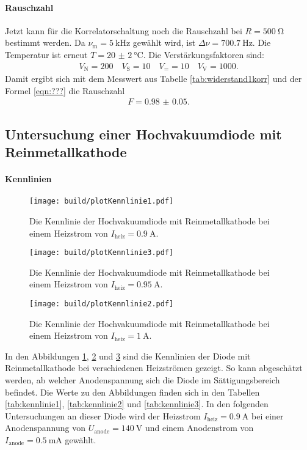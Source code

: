 \paragraph{Rauschzahl}

Jetzt kann für die Korrelatorschaltung noch die Rauschzahl bei $R = \SI{500}{\ohm}$ bestimmt werden. Da $\nu_\text{m} = \SI{5}{\kilo\hertz}$ gewählt wird, ist $\Delta \nu = \SI{700.7}{\hertz}$. Die Temperatur ist erneut $T = \SI{20(2)}{\celsius}$. Die Verstärkungsfaktoren sind:
\begin{align*}
  V_\text{N} = 200 \quad V_\text{S} = 10 \quad V_= = 10 \quad V_\text{V} = 1000.
\end{align*}
Damit ergibt sich mit dem Messwert aus Tabelle \ref{tab:widerstand1korr} und der Formel \eqref{eqn:???} die Rauschzahl
\begin{align}
  F = \num{0.98(5)}.
\end{align}

\subsection{Untersuchung einer Hochvakuumdiode mit Reinmetallkathode}

\paragraph{Kennlinien}
\begin{figure}
  \centering
  \texttt{[image: build/plotKennlinie1.pdf]}
  \caption{Die Kennlinie der Hochvakuumdiode mit Reinmetallkathode bei einem Heizstrom von $I_\text{heiz} = \SI{0.9}{\ampere}$.}
  \label{fig:plotKennlinie1}
\end{figure}
\begin{figure}
  \centering
  \texttt{[image: build/plotKennlinie3.pdf]}
  \caption{Die Kennlinie der Hochvakuumdiode mit Reinmetallkathode bei einem Heizstrom von $I_\text{heiz} = \SI{0.95}{\ampere}$.}
  \label{fig:plotKennlinie3}
\end{figure}
\begin{figure}
  \centering
  \texttt{[image: build/plotKennlinie2.pdf]}
  \caption{Die Kennlinie der Hochvakuumdiode mit Reinmetallkathode bei einem Heizstrom von $I_\text{heiz} = \SI{1}{\ampere}$.}
  \label{fig:plotKennlinie2}
\end{figure}
In den Abbildungen \ref{fig:plotKennlinie1}, \ref{fig:plotKennlinie3} und \ref{fig:plotKennlinie2} sind die Kennlinien der Diode mit Reinmetallkathode bei verschiedenen Heizströmen gezeigt. So kann abgeschätzt werden, ab welcher Anodenspannung sich die Diode im Sättigungsbereich befindet.
Die Werte zu den Abbildungen finden sich in den Tabellen \ref{tab:kennlinie1}, \ref{tab:kennlinie2} und \ref{tab:kennlinie3}.
In den folgenden Untersuchungen an dieser Diode wird der Heizstrom $I_\text{heiz} = \SI{0.9}{\ampere}$ bei einer Anodenspannung von $U_\text{anode} = \SI{140}{\volt}$
und einem Anodenstrom von $I_\text{anode} = \SI{0.5}{\milli\ampere}$ gewählt.

